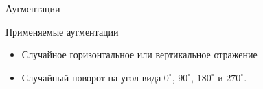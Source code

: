 \documentclass[9pt]{beamer}
\begin{document}
\begin{frame}{Аугментации}
    \begin{block}{Применяемые аугментации}
        \begin{itemize}
            \item Случайное горизонтальное или вертикальное отражение
            \item Случайный поворот на угол вида $0^{\circ}$, $90^{\circ}$, $180^{\circ}$ и $270^{\circ}$.
        \end{itemize}
    \end{block}

    \begin{figure}
        \setcounter{subfigure}{0}
        \centering
        \hskip2pt
        \hskip2pt
    \end{figure}
\end{frame}
\end{document}
